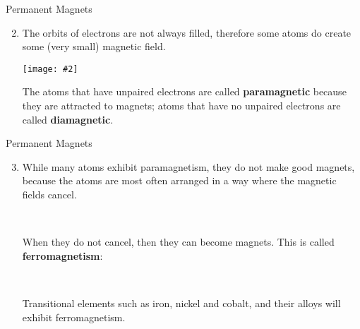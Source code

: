 \documentclass[12pt,aspectratio=169]{beamer}
\newcommand{\pic}[2]{\texttt{[image: \#2]}}
\begin{document}
\begin{frame}{Permanent Magnets}
  \begin{enumerate}
    \setcounter{enumi}{1}
  \item The orbits of electrons are not always filled, therefore some atoms do
    create some (very small) magnetic field.
    \begin{center}
      \pic{.4}{paramagnetic}
    \end{center}
    The atoms that have unpaired electrons are called \textbf{paramagnetic}
    because they are attracted to magnets; atoms that have no unpaired
    electrons are called \textbf{diamagnetic}.
  \end{enumerate}
\end{frame}



\begin{frame}{Permanent Magnets}
  \begin{enumerate}
    \setcounter{enumi}{2}
  \item While many atoms exhibit paramagnetism, they do not make good magnets,
    because the atoms are most often arranged in a way where the magnetic fields
    cancel.%
    \begin{center}
      \\
    \end{center}
    When they do not cancel, then they can become magnets. This is called
    \textbf{ferromagnetism}:
    \begin{center}
      \\
    \end{center}
    Transitional elements such as iron, nickel and cobalt, and their alloys
    will exhibit ferromagnetism.
  \end{enumerate}
\end{frame}
\end{document}
